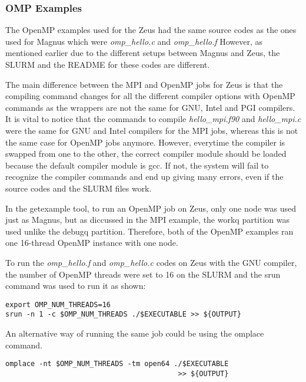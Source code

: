 \subsubsection{OMP Examples}

The OpenMP examples used for the Zeus had the same source codes as the ones used for Magnus which were \emph{omp\_hello.c} and \emph{omp\_hello.f}
However, as mentioned earlier due to the different setups between Magnus and Zeus, the SLURM and the README for these codes are different.

The main difference between the MPI and OpenMP jobs for Zeus is that the compiling command changes for all the different compiler options with OpenMP
commands as the wrappers are not the same for GNU, Intel and PGI compilers. It is vital to notice that the commands to compile \emph{hello\_mpi.f90} and
\emph{hello\_mpi.c} were the same for GNU and Intel compilers for the MPI jobs, whereas this is not the same case for OpenMP jobs anymore. However, 
everytime the compiler is swapped from one to the other, the correct compiler module should be loaded because the default compiler module is gcc. If not, 
the system will fail to recognize the compiler commands and end up giving many errors, even if the source codes and the SLURM files work.

In the getexample tool, to run an OpenMP job on Zeus, only one node was used just as Magnus, but as diccussed in the MPI example, the workq partition was
used unlike the debugq partition. Therefore, both of the OpenMP examples ran one 16-thread OpenMP instance with one node.

To run the \emph{omp\_hello.f} and \emph{omp\_hello.c} codes on Zeus with the GNU compiler, the number of OpenMP threads were set to 16 on the SLURM and 
the srun command was used to run it as shown:

\begin{tcolorbox}
\begin{Verbatim}[fontsize=\scriptsize]
export OMP_NUM_THREADS=16
srun -n 1 -c $OMP_NUM_THREADS ./$EXECUTABLE >> ${OUTPUT}
\end{Verbatim}
\end{tcolorbox}

An alternative way of running the same job could be using the omplace command.

\begin{tcolorbox}
\begin{Verbatim}[fontsize=\scriptsize]
omplace -nt $OMP_NUM_THREADS -tm open64 ./$EXECUTABLE 
                                         >> ${OUTPUT}
\end{Verbatim}
\end{tcolorbox}

